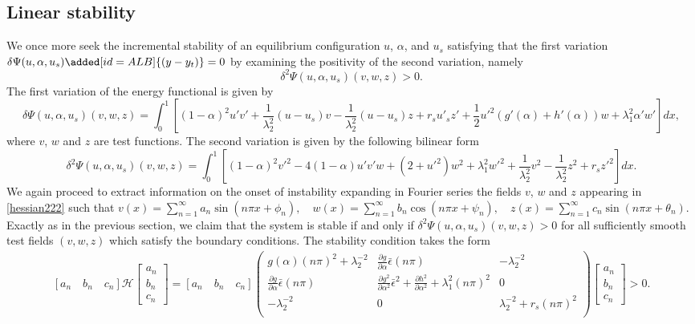 \subsection{Linear stability}
We once more seek the incremental stability of an equilibrium configuration $u$, $\alpha$, and $u_s$ satisfying that the first variation $\delta \Psi(u,\alpha,u_s)\added[id=ALB]{(y-y_t)}=0$  by examining the positivity of the second variation, namely
\begin{equation*}
\delta^2 \Psi(u,\alpha,u_s)(v,w,z)>0.
\end{equation*}
The first variation of the energy functional is given by
\begin{equation}
\delta \Psi(u,\alpha,u_s)(v,w,z)=\int_0^1 [(1-\alpha)^2u'v'+\frac{1}{\lambda_2^2} (u-u_s) v-\frac{1}{\lambda_2^2} (u-u_s) z+r_su'_sz'+\frac{1}{2}u'^2 (g'(\alpha)+h'(\alpha))w+\lambda_1^2\alpha'w' ]dx,\label{firstvar}
\end{equation}
where $v$, $w$ and $z$ are  test functions. The second variation is given by the following bilinear form 
\begin{equation}
\delta^2 \Psi(u,\alpha,u_s)(v,w,z)=\int_0^1 [(1-\alpha)^2v'^2 
- 4(1-\alpha)u' v'w+(2+ u'^2)w^2+\lambda_1^2w'^2 +\frac{1}{\lambda_2^2} v^2 -\frac{1}{\lambda_2^2} z^2+r_sz'^2]dx.\label{hessian222}\end{equation}
We again proceed to extract information on the onset of instability expanding in Fourier series the fields $v$, $w$ and $z$ appearing in \eqref{hessian222} such that $v(x)=\sum_{n=1}^{\infty} a_{n} \sin \left(n \pi x+\phi_{n}\right), \quad w(x)=\sum_{n=1}^{\infty} b_{n} \cos \left(n \pi x+\psi_{n}\right),\quad z(x)=\sum_{n=1}^{\infty} c_{n} \sin \left(n \pi x+\theta_{n}\right)$. Exactly as in the previous section, we claim that the system is stable if and only if $\delta^2 \Psi(u,\alpha,u_s)(v,w,z)>0$ for all sufficiently smooth test fields $(v, w, z)$ which satisfy the boundary conditions. The stability condition  takes the form
\begin{align}\left[ a_n \quad b_n \quad c_n  \right] \mathcal{H} \left[ \begin{array}{c} a_n \\ b_n  \\ c_n\end{array} \right]=\left[ a_n \quad b_n \quad c_n \right]\left(
\begin{array}{ccc}
g(\alpha)(n\pi)^2+\lambda_2^{-2}& \frac{\partial g}{\partial \alpha}\bar\epsilon(n\pi) &  -\lambda_2^{-2} \\
\frac{\partial g}{\partial \alpha}\bar\epsilon(n\pi) & \frac{\partial g^2}{\partial \alpha^2}\bar\epsilon^2+ \frac{\partial h^2}{\partial \alpha^2}+\lambda_1^2(n\pi)^2 & 0 \\
 -\lambda_2^{-2} & 0 & \lambda_2^{-2} +r_s(n\pi)^2\\
\end{array}
\right)\left[ \begin{array}{c} a_n \\ b_n \\c_n \end{array} \right]>0.\label{hessian3}\end{align}
